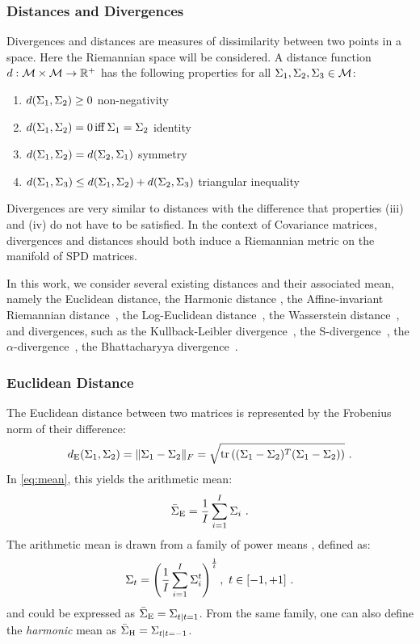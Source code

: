 \subsubsection{Distances and Divergences}
Divergences and distances are measures of dissimilarity between two points in a space.
Here the Riemannian space will be considered.
A distance function $d:\mathcal{M} \times \mathcal{M} \rightarrow \mathbb{R}^+$ has the following properties for all $\Sigma_1, \Sigma_2,\Sigma_3 \in \mathcal{M}$:
\begin{enumerate}[label=(\roman*)]
\item $d(\Sigma_1, \Sigma_2) \geq 0$  \tab non-negativity
\item $d(\Sigma_1, \Sigma_2) = 0 \, \mathrm{iff} \, \Sigma_1 = \Sigma_2$ \tab identity
\item $d(\Sigma_1, \Sigma_2) = d(\Sigma_2, \Sigma_1)$ \tab symmetry
\item $d(\Sigma_1, \Sigma_3) \leq d(\Sigma_1, \Sigma_2) + d(\Sigma_2, \Sigma_3)$ \tab triangular inequality 
\end{enumerate}
Divergences are very similar to distances with the difference that properties (iii) and (iv) do not have to be satisfied. 
In the context of Covariance matrices, divergences and distances should both induce a Riemannian metric on the manifold of SPD matrices. 

In this work, we consider several existing distances and their associated mean, namely the Euclidean distance, the Harmonic distance \cite{lim_matrix_2012}, the Affine-invariant Riemannian distance~\cite{pennec_riemannian_2006}, the Log-Euclidean distance~\cite{arsigny_geometric_2007}, the Wasserstein distance~\cite{VIL08}, and divergences, such as the Kullback-Leibler divergence~\cite{nielsen_sided_2009}, the S-divergence~\cite{sra_positive_2016}, the $\alpha$-divergence~\cite{nielsen_clustering_2014}, the Bhattacharyya divergence~\cite{chebbi_means_2012}.


\subsubsection{Euclidean Distance}
\label{sec:eucl-distance}
The Euclidean distance between two matrices is represented by the Frobenius norm of their difference:
\begin{equation}
\distF(\P_1, \P_2) = \lVert \P_1-\P_2 \rVert _F = \sqrt{ \tr \left( (\P_1-\P_2)^T (\P_1-\P_2) \right) } \ .
\label{eq:dist_eucl}
\end{equation}
In \eqref{eq:mean}, this yields the arithmetic mean:
\begin{equation}
\PmE = \frac{1}{\Nb} \sum_{\nb=1}^{\Nb} \P_\nb \ .
\label{eq:mean_arithmetic}
\end{equation}
The arithmetic mean is drawn from a family of power means \cite{lim_matrix_2012}, defined as:
\begin{equation}
\P_t = \left( \frac{1}{\Nb} \sum_{\nb=1}^{\Nb} \P_\nb^t \right)^{\frac{1}{t}}, \ t \in [-1,+1] \ .
\label{eq:mean_power}
\end{equation}
and could be expressed as $\bar{\Sigma}_{\operatorname{E}} = \Sigma_{t|t = 1}$. 
From the same family, one can also define the \emph{harmonic} mean as $\bar{\Sigma}_{\operatorname{H}} = \Sigma_{t|t = -1}$. 

